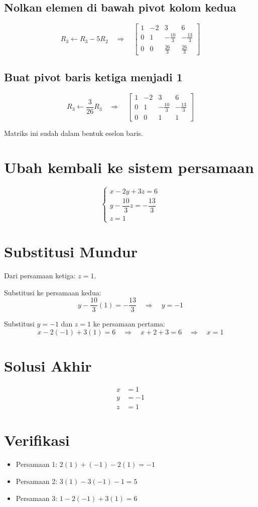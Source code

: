 \documentclass[12pt]{article}
\begin{document}
\subsection*{Nolkan elemen di bawah pivot kolom kedua}
\[
R_3 \leftarrow R_3 - 5R_2 \quad \Rightarrow \quad
\left[\begin{array}{ccc|c}
1 & -2 & 3 & 6 \\
0 & 1 & -\frac{10}{3} & -\frac{13}{3} \\
0 & 0 & \frac{26}{3} & \frac{26}{3}
\end{array}\right]
\]

\subsection*{Buat pivot baris ketiga menjadi 1}
\[
R_3 \leftarrow \frac{3}{26}R_3 \quad \Rightarrow \quad
\left[\begin{array}{ccc|c}
1 & -2 & 3 & 6 \\
0 & 1 & -\frac{10}{3} & -\frac{13}{3} \\
0 & 0 & 1 & 1
\end{array}\right]
\]

Matriks ini sudah dalam bentuk eselon baris.

\section*{Ubah kembali ke sistem persamaan}
\[
\begin{cases}
x - 2y + 3z = 6 \\
y - \dfrac{10}{3}z = -\dfrac{13}{3} \\
z = 1
\end{cases}
\]

\section*{Substitusi Mundur}

Dari persamaan ketiga: \( z = 1 \).

Substitusi ke persamaan kedua:
\[
y - \frac{10}{3}(1) = -\frac{13}{3} \quad \Rightarrow \quad y = -1
\]

Substitusi \( y = -1 \) dan \( z = 1 \) ke persamaan pertama:
\[
x - 2(-1) + 3(1) = 6 \quad \Rightarrow \quad x + 2 + 3 = 6 \quad \Rightarrow \quad x = 1
\]

\section*{Solusi Akhir}
\[
\boxed{
\begin{aligned}
x &= 1 \\
y &= -1 \\
z &= 1
\end{aligned}
}
\]

\section*{Verifikasi}
\begin{itemize}
    \item Persamaan 1: \( 2(1) + (-1) - 2(1) = -1 \) 
    \item Persamaan 2: \( 3(1) - 3(-1) - 1 = 5 \) 
    \item Persamaan 3: \( 1 - 2(-1) + 3(1) = 6 \) 
\end{itemize}
\end{document}
